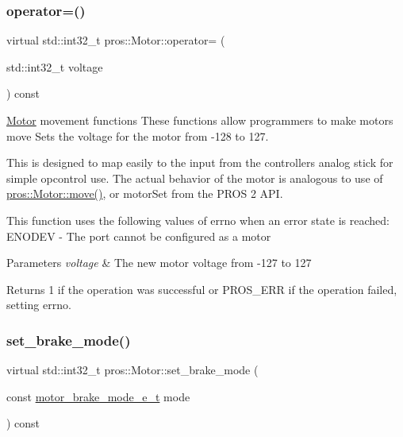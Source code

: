 \subsubsection{\texorpdfstring{operator=()}{operator=()}}
{\footnotesize\ttfamily virtual std\+::int32\+\_\+t pros\+::\+Motor\+::operator= (\begin{DoxyParamCaption}\item[{std\+::int32\+\_\+t}]{voltage }\end{DoxyParamCaption}) const\hspace{0.3cm}{\ttfamily [virtual]}}

\hyperlink{classpros_1_1Motor}{Motor} movement functions These functions allow programmers to make motors move Sets the voltage for the motor from -\/128 to 127.

This is designed to map easily to the input from the controller\textquotesingle{}s analog stick for simple opcontrol use. The actual behavior of the motor is analogous to use of \hyperlink{classpros_1_1Motor_a7ea9aedd4e12844be2584dc3f4b7a4bf}{pros\+::\+Motor\+::move()}, or motor\+Set from the P\+R\+OS 2 A\+PI.

This function uses the following values of errno when an error state is reached\+: E\+N\+O\+D\+EV -\/ The port cannot be configured as a motor


\begin{DoxyParams}{Parameters}
{\em voltage} & The new motor voltage from -\/127 to 127\\
\hline
\end{DoxyParams}
\begin{DoxyReturn}{Returns}
1 if the operation was successful or P\+R\+O\+S\+\_\+\+E\+RR if the operation failed, setting errno. 
\end{DoxyReturn}
\mbox{\label{classpros_1_1Motor_ab51969169dc534537f79710261daa3dd}} 
\subsubsection{\texorpdfstring{set\+\_\+brake\+\_\+mode()}{set\_brake\_mode()}}
{\footnotesize\ttfamily virtual std\+::int32\+\_\+t pros\+::\+Motor\+::set\+\_\+brake\+\_\+mode (\begin{DoxyParamCaption}\item[{const \hyperlink{motors_8h_aa324a2881696428c9e3684f9ad23a83b}{motor\+\_\+brake\+\_\+mode\+\_\+e\+\_\+t}}]{mode }\end{DoxyParamCaption}) const\hspace{0.3cm}{\ttfamily [virtual]}}

